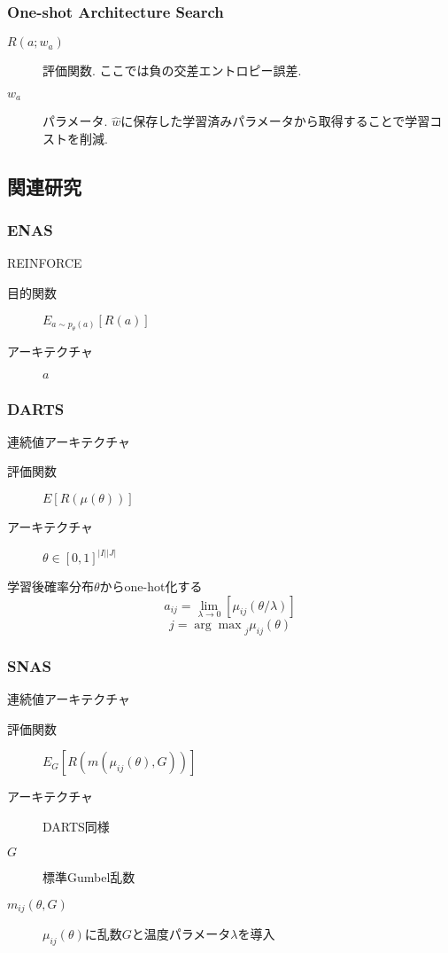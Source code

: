 \documentclass[twocolumn]{jarticle}     %
\begin{document}
\subsubsection{One-shot Architecture Search}
\begin{description}
  \item[$R(a; w_a)$] 評価関数. ここでは負の交差エントロピー誤差.
  \item[$w_a$] パラメータ. $\hat{w}$に保存した学習済みパラメータから取得することで学習コストを削減.
\end{description}

\subsection{関連研究}
\subsubsection{ENAS}
REINFORCE
\begin{description}
  \item[目的関数] $E_{a	\sim p_\theta{(a)}} [R(a)]$%
  \item[アーキテクチャ] $a$
\end{description}

\subsubsection{DARTS}
連続値アーキテクチャ
\begin{description}
  \item[評価関数] $E[R(\mu(\theta))]$
  \item[アーキテクチャ] $\theta \in [0, 1]^{|I||J|}$
\end{description}
学習後確率分布$\theta$からone-hot化する\\
\[a_{ij} = \lim_{\lambda \rightarrow 0} [\mu_{ij} (\theta / \lambda)]\]
\[j = {\arg\max}_j \mu_{ij}(\theta)\]

\subsubsection{SNAS}
連続値アーキテクチャ
\begin{description}
  \item[評価関数] $E_G [R(m(\mu_{ij}(\theta), G))]$
  \item[アーキテクチャ] DARTS同様
  \item[$G$] 標準Gumbel乱数
  \item[$m_{ij}(\theta, G)$] $\mu_{ij}(\theta)$に乱数$G$と温度パラメータ$\lambda$を導入
\end{description}
\end{document}
